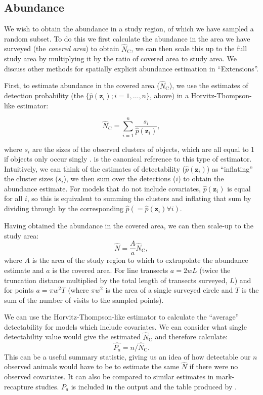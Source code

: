 \documentclass[article]{jss}
\begin{document}
\subsection{Abundance}\label{abundance}

We wish to obtain the abundance in a study region, of which we have
sampled a random subset. To do this we first calculate the abundance in
the area we have surveyed (the \emph{covered area}) to obtain
\(\hat{N}_\text{C}\), we can then scale this up to the full study area
by multiplying it by the ratio of covered area to study area. We discuss
other methods for spatially explicit abundance estimation in
``Extensions''.

First, to estimate abundance in the covered area (\(\hat{N}_\text{C}\)),
we use the estimates of detection probability (the
\(\{\hat{p}(\mathbf{z}_i); i=1,\ldots,n\}\), above) in a
Horvitz-Thompson-like estimator:

\begin{equation}
\hat{N}_\text{C} = \sum_{i=1}^n\frac{s_i}{\hat{p}(\mathbf{z}_i)},
\label{ht}
\end{equation}

where \(s_i\) are the sizes of the observed clusters of objects, which
are all equal to 1 if objects only occur singly \citep{Borchers:2004wr}.
\citet{thompson2012sampling} is the canonical reference to this type of
estimator. Intuitively, we can think of the estimates of detectability
(\(\hat{p}(\mathbf{z}_i)\)) as ``inflating'' the cluster sizes
(\(s_i\)), we then sum over the detections (\(i\)) to obtain the
abundance estimate. For models that do not include covariates,
\(\hat{p}(\mathbf{z}_i)\) is equal for all \(i\), so this is equivalent
to summing the clusters and inflating that sum by dividing through by
the corresponding \(\hat{p} (=\hat{p}(\mathbf{z}_i) \forall i)\).

Having obtained the abundance in the covered area, we can then scale-up
to the study area: \[
\hat{N} = \frac{A}{a} \hat{N}_\text{C},
\] where \(A\) is the area of the study region to which to extrapolate
the abundance estimate and \(a\) is the covered area. For line transects
\(a=2wL\) (twice the truncation distance multiplied by the total length
of transects surveyed, \(L\)) and for points \(a=\pi w^2 T\) (where
\(\pi w^2\) is the area of a single surveyed circle and \(T\) is the sum
of the number of visits to the sampled points).

We can use the Horvitz-Thompson-like estimator to calculate the
``average'' detectability for models which include covariates. We can
consider what single detectability value would give the estimated
\(\hat{N}_\text{C}\) and therefore calculate: \[
\hat{P_a} = n/\hat{N}_\text{C}.
\] This can be a useful summary statistic, giving us an idea of how
detectable our \(n\) observed animals would have to be to estimate the
same \(\hat{N}\) if there were no observed covariates. It can also be
compared to similar estimates in mark-recapture studies. \(P_a\) is
included in the  output and the table produced by
.
\end{document}
